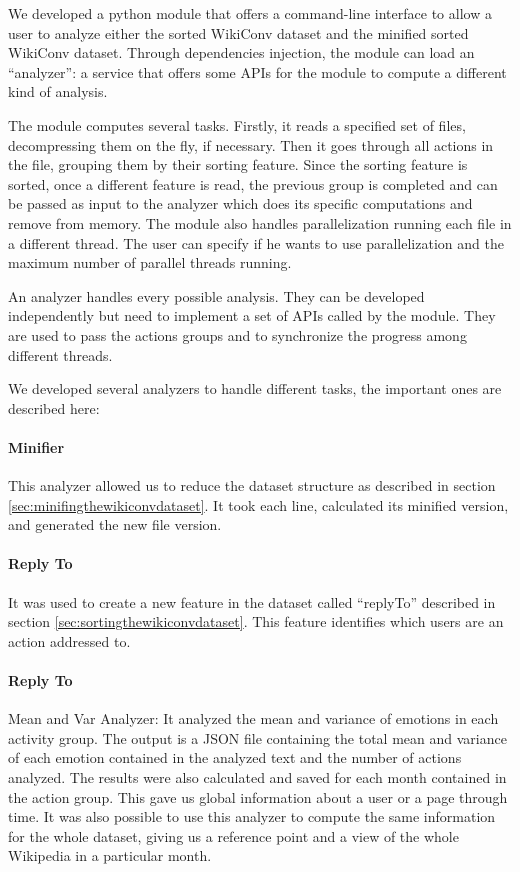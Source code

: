 We developed a python module that offers a command-line interface to allow a user to analyze either the sorted WikiConv dataset and the minified sorted WikiConv dataset. Through dependencies injection, the module can load an “analyzer”: a service that offers some APIs for the module to compute a different kind of analysis.

The module computes several tasks. Firstly, it reads a specified set of files, decompressing them on the fly, if necessary. Then it goes through all actions in the file, grouping them by their sorting feature. Since the sorting feature is sorted, once a different feature is read, the previous group is completed and can be passed as input to the analyzer which does its specific computations and remove from memory. The module also handles parallelization running each file in a different thread. The user can specify if he wants to use parallelization and the maximum number of parallel threads running.

An analyzer handles every possible analysis. They can be developed independently but need to implement a set of APIs called by the module. They are used to pass the actions groups and to synchronize the progress among different threads.

We developed several analyzers to handle different tasks, the important ones are described here:

\paragraph*{Minifier}
This analyzer allowed us to reduce the dataset structure as described in section \ref{sec:minifingthewikiconvdataset}. It took each line, calculated its minified version, and generated the new file version.

\paragraph*{Reply To}
It was used to create a new feature in the dataset called “replyTo” described in section \ref{sec:sortingthewikiconvdataset}. This feature identifies which users are an action addressed to.

\paragraph*{Reply To}
Mean and Var Analyzer:	It analyzed the mean and variance of emotions in each activity group. The output is a JSON file containing the total mean and variance of each emotion contained in the analyzed text and the number of actions analyzed. The results were also calculated and saved for each month contained in the action group. This gave us global information about a user or a page through time. It was also possible to use this analyzer to compute the same information for the whole dataset, giving us a reference point and a view of the whole Wikipedia in a particular month.

